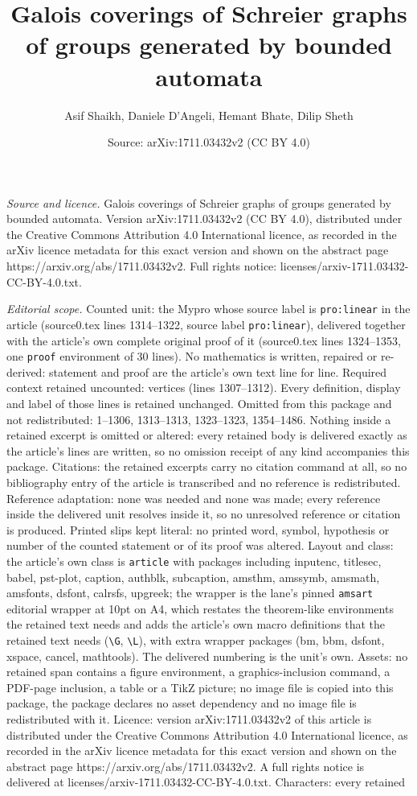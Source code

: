 \documentclass[10pt,a4paper]{amsart}
\title[Galois coverings of Schreier graphs of groups generated by b]{Galois coverings of Schreier graphs of groups generated by bounded automata}
\author{Asif Shaikh, Daniele D'Angeli, Hemant Bhate, Dilip Sheth}
\date{Source: arXiv:1711.03432v2 (CC BY 4.0)}
\begin{document}
\maketitle

\noindent\emph{Source and licence.} Galois coverings of Schreier graphs of groups generated by bounded automata. Version arXiv:1711.03432v2 (CC BY 4.0), distributed under the Creative Commons Attribution 4.0 International licence, as recorded in the arXiv licence metadata for this exact version and shown on the abstract page https://arxiv.org/abs/1711.03432v2. Full rights notice: licenses/arxiv-1711.03432-CC-BY-4.0.txt.\par\smallskip

\noindent\textit{Editorial scope.} Counted unit: the Mypro whose source label is \texttt{pro:linear} in the article (source0.tex lines 1314--1322, source label \texttt{pro:linear}), delivered together with the article's own complete original proof of it (source0.tex lines 1324--1353, one \texttt{proof} environment of 30 lines). No mathematics is written, repaired or re-derived: statement and proof are the article's own text line for line. Required context retained uncounted: vertices (lines 1307--1312). Every definition, display and label of those lines is retained unchanged. Omitted from this package and not redistributed: 1--1306, 1313--1313, 1323--1323, 1354--1486. Nothing inside a retained excerpt is omitted or altered: every retained body is delivered exactly as the article's lines are written, so no omission receipt of any kind accompanies this package. Citations: the retained excerpts carry no citation command at all, so no bibliography entry of the article is transcribed and no reference is redistributed. Reference adaptation: none was needed and none was made; every reference inside the delivered unit resolves inside it, so no unresolved reference or citation is produced. Printed slips kept literal: no printed word, symbol, hypothesis or number of the counted statement or of its proof was altered. Layout and class: the article's own class is \texttt{article} with packages including inputenc, titlesec, babel, pst-plot, caption, authblk, subcaption, amsthm, amssymb, amsmath, amsfonts, dsfont, calrsfs, upgreek; the wrapper is the lane's pinned \texttt{amsart} editorial wrapper at 10pt on A4, which restates the theorem-like environments the retained text needs and adds the article's own macro definitions that the retained text needs (\texttt{\textbackslash G}, \texttt{\textbackslash L}), with extra wrapper packages (bm, bbm, dsfont, xspace, cancel, mathtools). The delivered numbering is the unit's own. Assets: no retained span contains a figure environment, a graphics-inclusion command, a PDF-page inclusion, a table or a TikZ picture; no image file is copied into this package, the package declares no asset dependency and no image file is redistributed with it. Licence: version arXiv:1711.03432v2 of this article is distributed under the Creative Commons Attribution 4.0 International licence, as recorded in the arXiv licence metadata for this exact version and shown on the abstract page https://arxiv.org/abs/1711.03432v2. A full rights notice is delivered at licenses/arxiv-1711.03432-CC-BY-4.0.txt. Characters: every retained 
\end{document}
